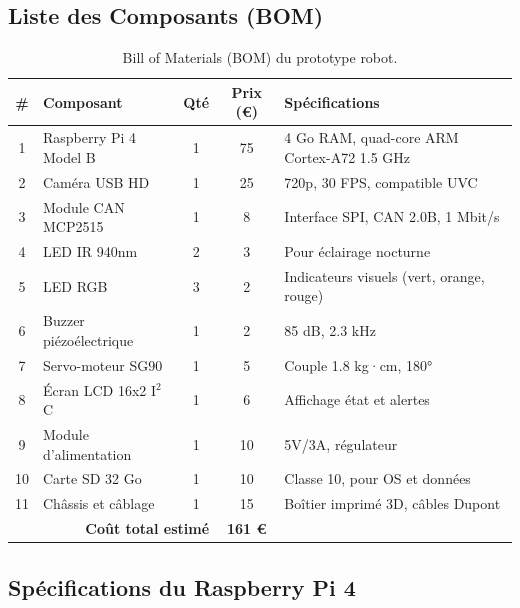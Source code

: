 \subsection{Liste des Composants (BOM)}

\begin{table}[H]
\centering
\caption{Bill of Materials (BOM) du prototype robot.}
\label{tab:bom}
\renewcommand{\arraystretch}{1.3}
\begin{tabularx}{\textwidth}{|c|l|c|c|X|}
\hline
\rowcolor{stellantisblue!15}
\textbf{\#} & \textbf{Composant} & \textbf{Qté} & \textbf{Prix (€)} & \textbf{Spécifications} \\
\hline
1 & Raspberry Pi 4 Model B & 1 & 75 & 4 Go RAM, quad-core ARM Cortex-A72 1.5 GHz \\
\hline
2 & Caméra USB HD & 1 & 25 & 720p, 30 FPS, compatible UVC \\
\hline
3 & Module CAN MCP2515 & 1 & 8 & Interface SPI, CAN 2.0B, 1 Mbit/s \\
\hline
4 & LED IR 940nm & 2 & 3 & Pour éclairage nocturne \\
\hline
5 & LED RGB & 3 & 2 & Indicateurs visuels (vert, orange, rouge) \\
\hline
6 & Buzzer piézoélectrique & 1 & 2 & 85 dB, 2.3 kHz \\
\hline
7 & Servo-moteur SG90 & 1 & 5 & Couple 1.8 kg·cm, 180° \\
\hline
8 & Écran LCD 16x2 I$^2$C & 1 & 6 & Affichage état et alertes \\
\hline
9 & Module d'alimentation & 1 & 10 & 5V/3A, régulateur \\
\hline
10 & Carte SD 32 Go & 1 & 10 & Classe 10, pour OS et données \\
\hline
11 & Châssis et câblage & 1 & 15 & Boîtier imprimé 3D, câbles Dupont \\
\hline
\multicolumn{3}{|r|}{\textbf{Coût total estimé}} & \textbf{161 €} & \\
\hline
\end{tabularx}
\end{table}

\subsection{Spécifications du Raspberry Pi 4}

